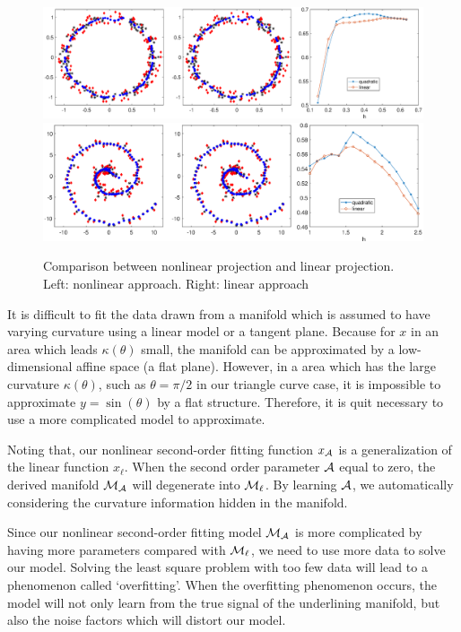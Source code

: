 \documentclass{article}
\theoremstyle{remark}
\begin{document}
\begin{figure}[t] %
   \centering
    \includegraphics[width=\linewidth]{circle_result.eps} 
     \includegraphics[width=\linewidth]{swiss_roll.eps} 
   \caption{Comparison between nonlinear projection and linear projection. Left: nonlinear approach. Right: linear approach}
   \label{fig:sin_curve}
\end{figure}

It is difficult to fit the data drawn from a manifold which is assumed to have varying curvature using a linear model or a tangent plane. Because for $x$ in an area which leads $\kappa(\theta)$ small, the manifold can be approximated by a low-dimensional affine space (a flat plane). However, in a area which has the large curvature $\kappa(\theta)$, such as $\theta=\pi/2$ in our triangle curve case, it is impossible to approximate $y = \sin(\theta)$ by a flat structure. Therefore, it is quit necessary to use a more complicated model to approximate. 

Noting that, our nonlinear second-order fitting function $x_{\cal A}$ is a generalization of the linear function $x_\ell$. When the second order parameter $\cal A$ equal to zero, the derived manifold $\cal M_A$ will degenerate into ${\cal M}_\ell$. By learning $\cal A$, we automatically considering the curvature information hidden in the manifold.


Since our nonlinear second-order fitting model $\cal M_A$ is more complicated by having more parameters compared with ${\cal M}_\ell$, we need to use more data to solve our model. Solving the least square problem with too few data will lead to a phenomenon called `overfitting'. When the overfitting phenomenon occurs, the model will not only learn from the true signal of the underlining manifold, but also the noise factors which will distort our model.
\end{document}
